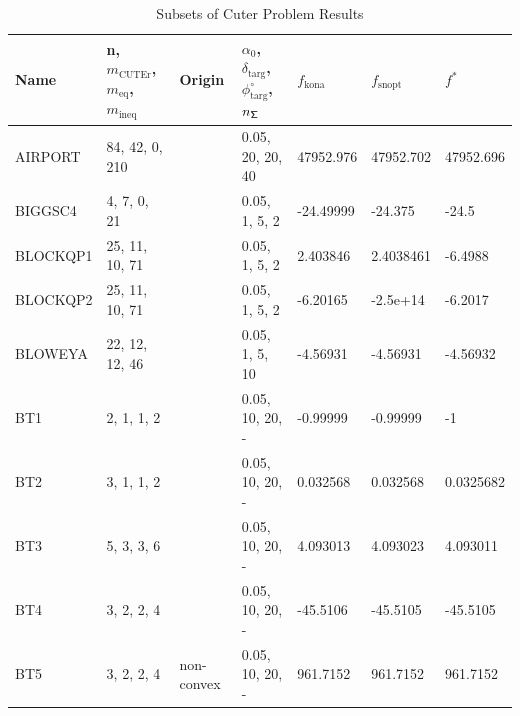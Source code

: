 \begin{landscape}
\begin{longtable}{l | l |  l  |  >{\footnotesize}p{3cm} | l | l | l    }      %
\caption{Subsets of Cuter Problem Results}\label{tab:cuter} \\
 \hline 
Name      &  n,  $m_{\text{CUTEr}}$, $m_{\text{eq}}$,  $m_{\text{ineq}}$        &     Origin      &\textbf{$\alpha_0$},  $\delta_{\text{targ}}$, $\phi^{\circ}_{\text{targ}}$,  $n_{\mathsf{\Sigma}}$      & $ f_{\text{kona}} $   & $ f_{\text{snopt}} $ &$ f^*$    \\ \hline
AIRPORT    &  84,  42, 0, 210  &    &  0.05, 20, 20, 40 & 47952.976  & 47952.702  & 47952.696   \\ \hline
BIGGSC4    &  4, 7, 0, 21  &    & 0.05, 1, 5, 2  &  -24.49999  & -24.375   & -24.5    \\ \hline
BLOCKQP1 &  25, 11, 10, 71  &     & 0.05, 1, 5, 2 & 2.403846   & 2.4038461  &  -6.4988    \\ \hline
BLOCKQP2  &  25, 11, 10, 71  &     & 0.05, 1, 5, 2 & -6.20165    & -2.5e+14  & -6.2017    \\ \hline
BLOWEYA &  22, 12, 12, 46  &      &   0.05, 1, 5, 10  & -4.56931  & -4.56931   & -4.56932   \\ \hline
BT1    &   2, 1, 1, 2  & &  0.05, 10, 20, -    &  -0.99999  & -0.99999   & -1   \\ \hline
BT2    &3, 1, 1, 2  & & 0.05, 10, 20, -   & 0.032568  &  0.032568  & 0.0325682  \\ \hline
BT3    &5, 3, 3, 6 & & 0.05, 10, 20, -   &  4.093013  &  4.093023  & 4.093011 \\ \hline
BT4   &     3, 2, 2, 4 & & 0.05, 10, 20, -   & -45.5106  &  -45.5105  & -45.5105  \\ \hline
BT5   &   3, 2, 2, 4  & non-convex& 0.05, 10, 20, -  & 961.7152  &  961.7152  & 961.7152    \\ \hline

\end{longtable}
\end{landscape}
